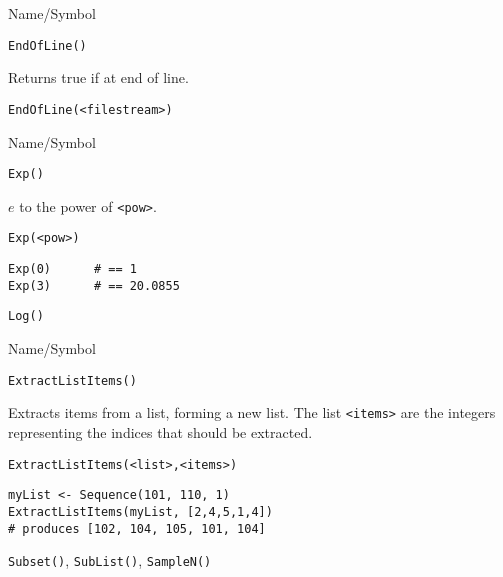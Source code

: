 \begin{desc}{Name/Symbol}
\item[Name/Symbol]	\verb+EndOfLine()+

\item[Description]	Returns true if at end of line.

\item[Usage]
\begin{verbatim}
EndOfLine(<filestream>)
\end{verbatim}

\item[Example]	

\item[See Also]	
\end{desc}

\rl




\begin{desc}{Name/Symbol}
\item[Name/Symbol]  	\verb+Exp()+

\item[Description]	$e$ to the power of \verb+<pow>+.

\item[Usage]
\begin{verbatim}
Exp(<pow>)
\end{verbatim}

\item[Example]
\begin{verbatim}
Exp(0) 		# == 1
Exp(3)		# == 20.0855
\end{verbatim}

\item[See Also]	\verb+Log()+
\end{desc}

\rl




\begin{desc}{Name/Symbol}
\item[Name/Symbol]	\verb+ExtractListItems()+

\item[Description]	Extracts items from a list, forming a new list. 
		The list \verb+<items>+ are the integers representing the
		indices that should be extracted.  
	     
\item[Usage]
\begin{verbatim}
ExtractListItems(<list>,<items>)
\end{verbatim}

\item[Example]
\begin{verbatim}
myList <- Sequence(101, 110, 1)
ExtractListItems(myList, [2,4,5,1,4])
# produces [102, 104, 105, 101, 104]
\end{verbatim}

\item[See Also]	\verb+Subset()+, \verb+SubList()+, \verb+SampleN()+
\end{desc}

